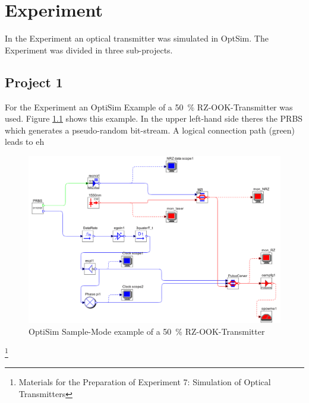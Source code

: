\chapter{Experiment}
\label{ch:experiment}

In the Experiment an optical transmitter was simulated in OptSim. The Experiment was divided in three sub-projects.

\section{Project 1}
\label{sec:P1}
For the Experiment an OptiSim Example of a 50~\% RZ-OOK-Transmitter was used. Figure \ref{fig:P1_aufbau} shows this example\footnotemark[3]. In the upper left-hand side theres the PRBS which generates a pseudo-random bit-stream. A logical connection path (green) leads to eh


\begin{figure}%
\includegraphics[width=\columnwidth]{Grafiken/P1_aufbau.jpg}%
\caption{OptiSim Sample-Mode example of a 50~\% RZ-OOK-Transmitter}%
\label{fig:P1_aufbau}%
\end{figure}


\footnote[3]{Materials for the Preparation of Experiment 7: Simulation of Optical Transmitters}
